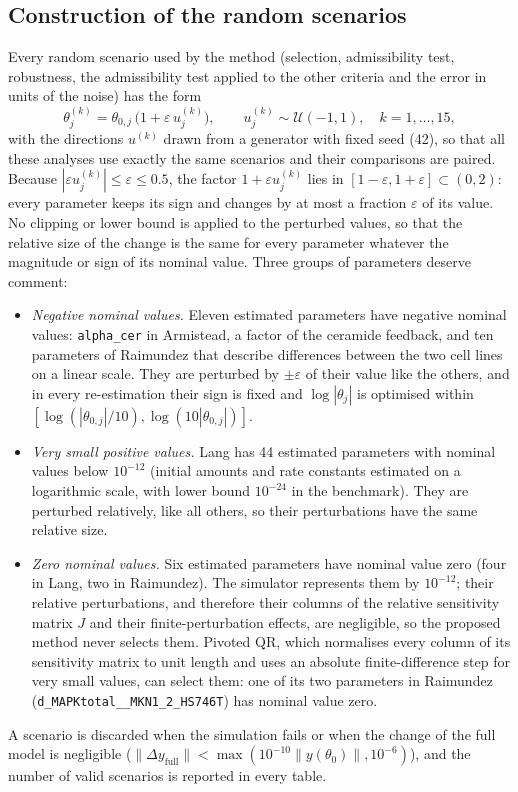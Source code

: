 \subsection*{Construction of the random scenarios}
Every random scenario used by the method (selection, admissibility test, robustness, the admissibility test applied to the other criteria and the error in units of the noise) has the form
\[ \theta^{(k)}_j=\theta_{0,j}\,\bigl(1+\varepsilon\,u^{(k)}_j\bigr),\qquad u^{(k)}_j\sim\mathcal U(-1,1),\quad k=1,\dots,15, \]
with the directions $u^{(k)}$ drawn from a generator with fixed seed (42), so that all these analyses use exactly the same scenarios and their comparisons are paired. Because $|\varepsilon u^{(k)}_j|\le\varepsilon\le0.5$, the factor $1+\varepsilon u^{(k)}_j$ lies in $[1-\varepsilon,1+\varepsilon]\subset(0,2)$: every parameter keeps its sign and changes by at most a fraction $\varepsilon$ of its value. No clipping or lower bound is applied to the perturbed values, so that the relative size of the change is the same for every parameter whatever the magnitude or sign of its nominal value. Three groups of parameters deserve comment:
\begin{itemize}\itemsep0pt
\item \emph{Negative nominal values.} Eleven estimated parameters have negative nominal values: \texttt{alpha\_cer} in Armistead, a factor of the ceramide feedback, and ten parameters of Raimundez that describe differences between the two cell lines on a linear scale. They are perturbed by $\pm\varepsilon$ of their value like the others, and in every re-estimation their sign is fixed and $\log|\theta_j|$ is optimised within $[\log(|\theta_{0,j}|/10),\log(10|\theta_{0,j}|)]$.
\item \emph{Very small positive values.} Lang has 44 estimated parameters with nominal values below $10^{-12}$ (initial amounts and rate constants estimated on a logarithmic scale, with lower bound $10^{-24}$ in the benchmark). They are perturbed relatively, like all others, so their perturbations have the same relative size.
\item \emph{Zero nominal values.} Six estimated parameters have nominal value zero (four in Lang, two in Raimundez). The simulator represents them by $10^{-12}$; their relative perturbations, and therefore their columns of the relative sensitivity matrix $J$ and their finite-perturbation effects, are negligible, so the proposed method never selects them. Pivoted QR, which normalises every column of its sensitivity matrix to unit length and uses an absolute finite-difference step for very small values, can select them: one of its two parameters in Raimundez (\texttt{d\_MAPKtotal\_\_MKN1\_2\_HS746T}) has nominal value zero.
\end{itemize}
A scenario is discarded when the simulation fails or when the change of the full model is negligible ($\|\Delta y_{\mathrm{full}}\|<\max(10^{-10}\|y(\theta_0)\|,10^{-6})$), and the number of valid scenarios is reported in every table.


